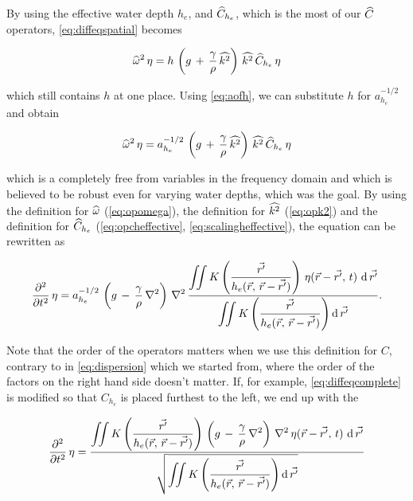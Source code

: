 By using the effective water depth $h_e$, and $\widehat{C}_{h_e}$, which is the most  of our $\widehat{C}$ operators, \eqref{eq:diffeqspatial} becomes

\begin{equation} \label{eq:diffeqonehstillunknown}
\widehat{\omega}^2\,\eta = h\,\left(g\,+\,\frac{\gamma}{\rho}\,\widehat{k^2}\right)\,\widehat{k^2}\,\widehat{C}_{h_e}\,\eta
\end{equation}

which still contains $h$ at one place. Using \eqref{eq:aofh}, we can substitute $h$ for $a_{h_e}^{-1/2}$ and obtain

\begin{equation} \label{eq:diffeqcomplete}
\widehat{\omega}^2\,\eta = a_{h_e}^{-1/2}\,\left(g\,+\,\frac{\gamma}{\rho}\,\widehat{k^2}\right)\,\widehat{k^2}\,\widehat{C}_{h_e}\,\eta
\end{equation}

which is a \PDE completely free from variables in the frequency domain and which is believed to be robust even for varying water depths, which was the goal. By using the definition for $\widehat{\omega}$ (\eqref{eq:opomega}), the definition for $\widehat{k^2}$ (\eqref{eq:opk2}) and the definition for $\widehat{C}_{h_e}$ (\eqref{eq:opcheffective}, \eqref{eq:scalingheffective}), the equation can be rewritten as

\begin{equation} \label{eq:diffeqnouserdefinedoperators}
\frac{\partial^2}{\partial t^2}\,\eta = a_{h_e}^{-1/2}\,\left(g\,-\,\frac{\gamma}{\rho}\,\nabla^2\right)\,\nabla^2\,\frac{\displaystyle\iint K\left(\frac{\vec{r'}}{h_e(\vec{r},\,\vec{r}-\vec{r'})}\right)\,\eta(\vec{r}-\vec{r'},\,t)\,\operatorname{d}\vec{r'}}{\displaystyle\iint K\left(\frac{\vec{r'}}{h_e(\vec{r},\,\vec{r}-\vec{r'})}\right) \operatorname{d}\vec{r'}}.
\end{equation}

Note that the order of the operators matters when we use this definition for $C$, contrary to in \eqref{eq:dispersion} which we started from, where the order of the factors on the right hand side doesn't matter. If, for example, \eqref{eq:diffeqcomplete} is modified so that $C_{h_e}$ is placed furthest to the left, we end up with the \PDE

\begin{equation} \label{eq:diffeqnouserdefinedoperatorsvariant}
\frac{\partial^2}{\partial t^2}\,\eta = \frac{\displaystyle\iint K\left(\frac{\vec{r'}}{h_e(\vec{r},\,\vec{r}-\vec{r'})}\right)\,\left(g\,-\,\frac{\gamma}{\rho}\,\nabla^2\right)\,\nabla^2\,\eta(\vec{r}-\vec{r'},\,t)\,\operatorname{d}\vec{r'}}{\sqrt{\displaystyle\iint K\left(\frac{\vec{r'}}{h_e(\vec{r},\,\vec{r}-\vec{r'})}\right) \operatorname{d}\vec{r'}}}
\end{equation}

